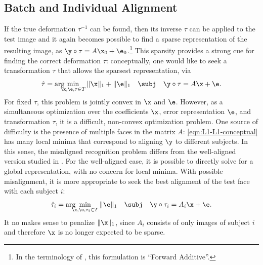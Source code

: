 \subsection{Batch and Individual Alignment} If the
true deformation $\tau^{-1}$ can be found, then
its inverse $\tau$ can be applied to the test image and it again becomes
possible to find a sparse representation of the resulting
image, as $\y \circ \tau = A \x_0 + \e_0$.\footnote{In the terminology of \cite{baker2004lucas}, this formulation is ``Forward Additive''.}
  This sparsity
provides a strong cue for finding the correct deformation
$\tau$: conceptually, one would like to seek a transformation
$\tau$ that allows the sparsest representation, via
\begin{equation} \label{eqn:L1-L1-conceptual}
\hat{\tau} = \arg\hspace{-2.5mm}\min_{\x,\e,\tau \in T} \| \x \|_1 + \| \e \|_1 \quad \subj \quad \y \circ \tau = A \x + \e.
\end{equation}
For fixed $\tau$, this problem is jointly convex in $\x$ and
$\e$. However, as a simultaneous optimization over the
coefficients $\x$, error representation $\e$, and
transformation $\tau$, it is a difficult, non-convex
optimization problem. One source of difficulty is the presence
of multiple faces in the matrix $A$:
\eqref{eqn:L1-L1-conceptual} has many local minima that
correspond to aligning $\y$ to different subjects. In this
sense, the misaligned recognition problem differs from the
well-aligned version studied in \cite{Wright2009-PAMI}. For the
well-aligned case, it is possible to directly solve for a
global representation, with no concern for local minima. With
possible misalignment, it is more appropriate to seek the best
alignment of the test face with each subject $i$:
\begin{equation} \label{eqn:per-subject-L1}
\hat \tau_i = \arg\hspace{-2.5mm}\min_{\x,\e,\tau_i \in T} \| \e \|_1 \quad \subj \quad \y \circ \tau_i = A_i \x + \e.
\end{equation}
It no makes sense to penalize $\| \x \|_1$, since $A_i$ consists of
only images of subject $i$ and therefore $\x$ is no longer expected to
be sparse.

